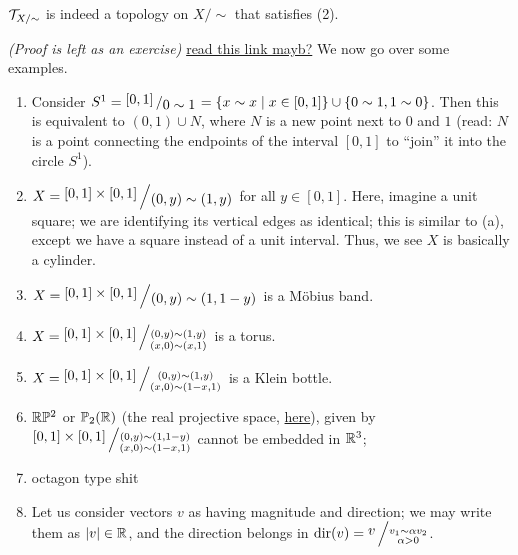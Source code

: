 \newpage
\begin{simpleclaim}
    $\mathcal T_{X/{\sim}}$ is indeed a topology on $X/{\sim}$ that satisfies (2).
\end{simpleclaim}
\noindent \textit{(Proof is left as an exercise)} \href{https://math.stackexchange.com/questions/1497863/why-is-the-quotient-topology-unique}{read this link mayb?}
\medskip\newline
We now go over some examples.
\begin{enumerate}[label=(\alph*)]
    \item Consider $S^1 = \bigslant{[0, 1]}{0 \sim 1} = \{x \sim x \mid x \in [0, 1]\} \cup \{0 \sim 1, 1 \sim 0\}$. Then this is equivalent to $(0, 1) \cup N$, where $N$ is a new point next to $0$ and $1$ (read: $N$ is a point connecting the endpoints of the interval $[0, 1]$ to ``join'' it into the circle $S^1$).
    \item $X = \bigslant{[0, 1] \times [0, 1]}{(0, y) \sim (1, y)}$ for all $y \in [0, 1]$. Here, imagine a unit square; we are identifying its vertical edges as identical; this is similar to (a), except we have a square instead of a unit interval. Thus, we see $X$ is basically a cylinder.
    \item $X = \bigslant{[0, 1] \times [0, 1]}{(0, y) \sim (1, 1-y)}$ is a M\"obius band.
    \item $X = \bigslant{[0, 1] \times [0, 1]}{\substack{(0, y) \sim (1, y) \\ (x, 0) \sim (x, 1)}}$ is a torus.
    \item $X = \bigslant{[0, 1] \times [0, 1]}{\substack{(0, y) \sim (1, y) \\ (x, 0) \sim (1 - x, 1)}}$ is a Klein bottle.
    \item $\mathbb R\mathbb P^2$ or $\mathbb P_2(\mathbb R)$ (the real projective space, \href{https://www.mfo.de/about-the-institute/history/boy-surface}{here}), given by $\bigslant{[0, 1] \times [0, 1]}{\substack{(0, y) \sim (1, 1 - y) \\ (x, 0) \sim (1 - x, 1)}}$ cannot be embedded in $\mathbb R^3$;   
    \item octagon type shit
    \item Let us consider vectors $v$ as having magnitude and direction; we may write them as $\left\lvert v \right\rvert \in \mathbb R$, and the direction belongs in $\mathrm{dir}(v) = \bigslant{v}{\substack{v_1 \sim \alpha v_2 \\ \alpha > 0}}$.
\end{enumerate}